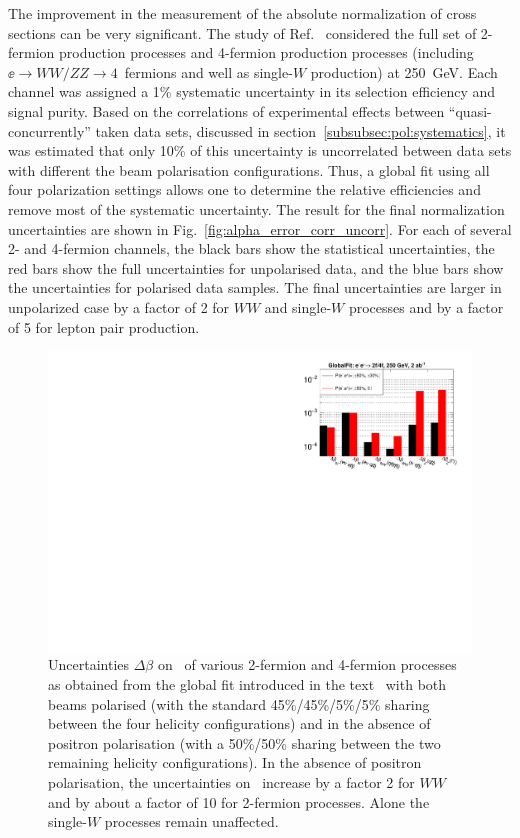 The improvement in the measurement of the absolute normalization of cross sections can be very significant.  The study of Ref.~\cite{bib:PhDRobert} considered the full set of 2-fermion production processes and 4-fermion production processes (including $\ee\to WW / ZZ \to 4$~fermions and well as single-$W$ production) at 250~GeV.   Each channel was assigned a 1\% systematic uncertainty in its selection efficiency and signal purity. Based on the correlations of experimental effects between ``quasi-concurrently'' taken data sets, discussed in section~\ref{subsubsec:pol:systematics}, it was estimated that only 10\% of this uncertainty is uncorrelated between data sets with different the beam polarisation configurations. Thus, a global fit using all four
polarization settings allows one to determine the relative efficiencies and remove most of the systematic uncertainty.  The result for the final normalization uncertainties are shown in 
Fig.~\ref{fig:alpha_error_corr_uncorr}.  For each of several 2- and 4-fermion channels, the black bars show the statistical uncertainties, the red bars show the full uncertainties for unpolarised data, and the blue bars show the uncertainties for polarised data samples.   The final uncertainties are larger in unpolarized case by a factor of 2 for $WW$ and single-$W$ processes and by a factor of 5 for lepton pair production.

\begin{figure}
\centering
\includegraphics[width=0.95\linewidth]{./chapters/figures/beta_precision_upolarized.pdf}
		
\caption{Uncertainties $\Delta \beta$ on \ALR\ of various 2-fermion and 4-fermion processes as obtained from the global fit introduced in the text~\cite{bib:PhDRobert} with both beams polarised (with the standard 45\%/45\%/5\%/5\% sharing between the four helicity configurations) and in the absence of positron polarisation (with a 50\%/50\% sharing between the two remaining helicity configurations). In the absence of positron polarisation, the  uncertainties on \ALR\ increase by a factor 2 for $WW$ and by about a factor of 10 for 2-fermion processes. Alone the single-$W$ processes remain unaffected.}
\label{fig:beta_error_noposipol}
\end{figure}


